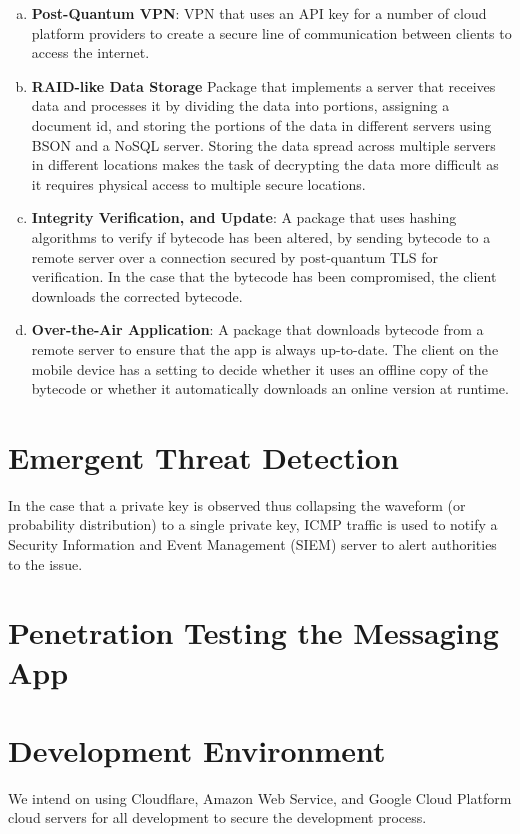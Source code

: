 \documentclass{article}
\begin{document}
\begin{enumerate}[(a)]
    \item \textbf{Post-Quantum VPN}: VPN that uses an API key for a number of cloud platform providers to create a secure line of communication between clients to access the internet.
    \item \textbf{RAID-like Data Storage} Package that implements a server that receives data and processes it by dividing the data into portions, assigning a document id, and storing the portions of the data in different servers using BSON and a NoSQL server. Storing the data spread across multiple servers in different locations makes the task of decrypting the data more difficult as it requires physical access to multiple secure locations. 
    \item \textbf{Integrity Verification, and Update}: A package that uses hashing algorithms to verify if bytecode has been altered, by sending bytecode to a remote server over a connection secured by post-quantum TLS for verification. In the case that the bytecode has been compromised, the client downloads the corrected bytecode.
    \item \textbf{Over-the-Air Application}: A package that downloads bytecode from a remote server to ensure that the app is always up-to-date. The client on the mobile device has a setting to decide whether it uses an offline copy of the bytecode or whether it automatically downloads an online version at runtime.
\end{enumerate}

\section{Emergent Threat Detection}
In the case that a private key is observed thus collapsing the waveform (or probability distribution) to a single private key, ICMP traffic is used to notify a Security Information and Event Management (SIEM) server to alert authorities to the issue.


\section{Penetration Testing the Messaging App}

\section{Development Environment}

We intend on using Cloudflare, Amazon Web Service, and Google Cloud Platform cloud servers for all development to secure the development process.
\end{document}
